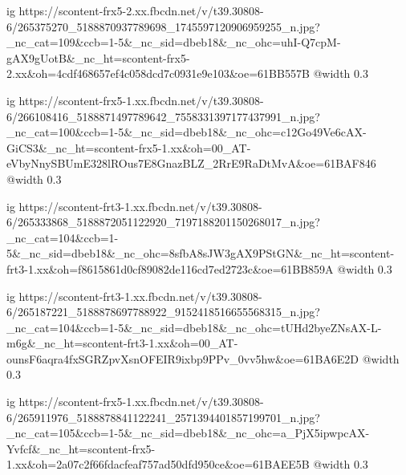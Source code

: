  
 
 
 
 


\ifcmt
  ig https://scontent-frx5-2.xx.fbcdn.net/v/t39.30808-6/265375270_5188870937789698_1745597120906959255_n.jpg?_nc_cat=109&ccb=1-5&_nc_sid=dbeb18&_nc_ohc=uhI-Q7cpM-gAX9gUotB&_nc_ht=scontent-frx5-2.xx&oh=4cdf468657ef4c058dcd7c0931e9e103&oe=61BB557B
  @width 0.3
\fi


\ifcmt
  ig https://scontent-frx5-1.xx.fbcdn.net/v/t39.30808-6/266108416_5188871497789642_7558331397177437991_n.jpg?_nc_cat=100&ccb=1-5&_nc_sid=dbeb18&_nc_ohc=c12Go49Ve6cAX-GiCS3&_nc_ht=scontent-frx5-1.xx&oh=00_AT-eVbyNnySBUmE328lROus7E8GnazBLZ_2RrE9RaDtMvA&oe=61BAF846
  @width 0.3
\fi


\ifcmt
  ig https://scontent-frt3-1.xx.fbcdn.net/v/t39.30808-6/265333868_5188872051122920_7197188201150268017_n.jpg?_nc_cat=104&ccb=1-5&_nc_sid=dbeb18&_nc_ohc=8sfbA8sJW3gAX9PStGN&_nc_ht=scontent-frt3-1.xx&oh=f8615861d0cf89082de116cd7ed2723c&oe=61BB859A
  @width 0.3
\fi


\ifcmt
  ig https://scontent-frt3-1.xx.fbcdn.net/v/t39.30808-6/265187221_5188878697788922_9152418516655568315_n.jpg?_nc_cat=104&ccb=1-5&_nc_sid=dbeb18&_nc_ohc=tUHd2byeZNsAX-L-m6g&_nc_ht=scontent-frt3-1.xx&oh=00_AT-ounsF6aqra4fxSGRZpvXsnOFEIR9ixbp9PPv_0vv5hw&oe=61BA6E2D
  @width 0.3
\fi


\ifcmt
  ig https://scontent-frx5-1.xx.fbcdn.net/v/t39.30808-6/265911976_5188878841122241_2571394401857199701_n.jpg?_nc_cat=105&ccb=1-5&_nc_sid=dbeb18&_nc_ohc=a_PjX5ipwpcAX-Yvfcf&_nc_ht=scontent-frx5-1.xx&oh=2a07c2f66fdacfeaf757ad50dfd950ce&oe=61BAEE5B
  @width 0.3
\fi
